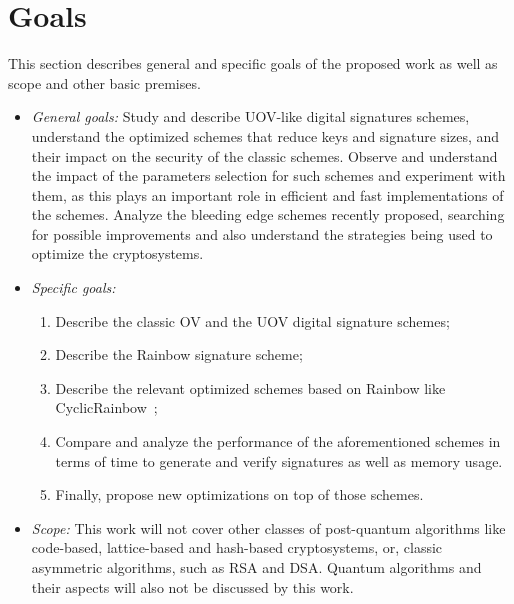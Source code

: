 \documentclass{ufsctex/ufsctex}
\begin{document}
\section{Goals}

This section describes general and specific goals of the proposed work as well
as scope and other basic premises.

\begin{itemize}

    \item \textit{General goals:} Study and describe UOV-like digital
    signatures schemes, understand the optimized schemes that reduce keys and
    signature sizes, and their impact on the security of the classic schemes.
    Observe and understand the impact of the parameters selection for such
    schemes and experiment with them, as this plays an important role in
    efficient and fast implementations of the schemes. Analyze the bleeding
    edge schemes recently proposed, searching for possible improvements and
    also understand the strategies being used to optimize the cryptosystems.

    \item \textit{Specific goals:} \begin{enumerate}

        \item Describe the classic OV and the UOV digital signature schemes;

        \item Describe the Rainbow signature scheme;

        \item Describe the relevant optimized schemes based on Rainbow like
        CyclicRainbow~\cite{petzoldt2010cyclicrainbow};

        \item Compare and analyze the performance of the aforementioned schemes
        in terms of time to generate and verify signatures as well as memory
        usage.

        \item Finally, propose new optimizations on top of those schemes.

    \end{enumerate}

    \item \textit{Scope:} This work will not cover other classes of
    post-quantum algorithms like code-based, lattice-based and hash-based
    cryptosystems, or, classic asymmetric algorithms, such as RSA and DSA.
    Quantum algorithms and their aspects will also not be discussed by this
    work.


\end{itemize}
\end{document}
